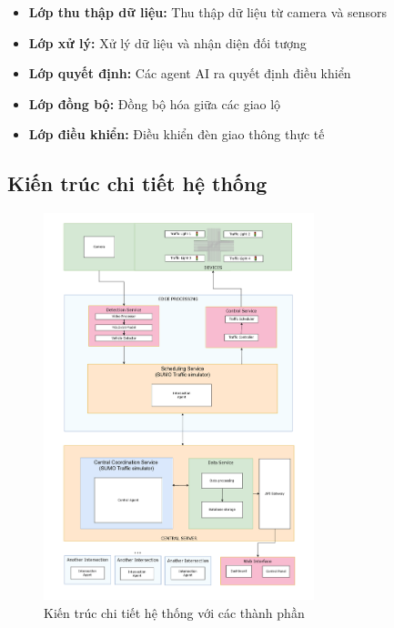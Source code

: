 \begin{itemize}
    \item \textbf{Lớp thu thập dữ liệu:} Thu thập dữ liệu từ camera và sensors

    \item \textbf{Lớp xử lý:} Xử lý dữ liệu và nhận diện đối tượng

    \item \textbf{Lớp quyết định:} Các agent AI ra quyết định điều khiển

    \item \textbf{Lớp đồng bộ:} Đồng bộ hóa giữa các giao lộ

    \item \textbf{Lớp điều khiển:} Điều khiển đèn giao thông thực tế
\end{itemize}

\subsection{Kiến trúc chi tiết hệ thống}

\begin{figure}[!htp]
    \centering
    \includegraphics[width=0.7\textwidth]{img/detailed_architecture.png}
    \caption{Kiến trúc chi tiết hệ thống với các thành phần}
    \label{fig:detailed_architecture}
\end{figure}


